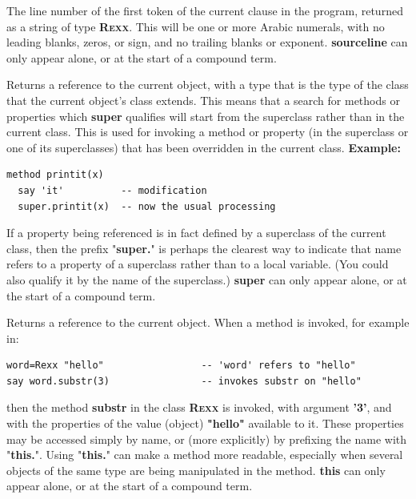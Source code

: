 \begin{description}
The line number of the first token of the current clause in the
\nr{} program, returned as a string of type \textbf{R\textsc{exx}}.
This will be one or more Arabic numerals, with no leading blanks, zeros,
or sign, and no trailing blanks or exponent.
 \textbf{sourceline} can only appear alone, or at the start of a
compound term.
\item[super]\label{refswsuper}
 
Returns a reference to the current object, with a type that is the
type of the class that the current object's class extends.
This means that a search for methods or properties
which \textbf{super} qualifies will start from the superclass rather
than in the current class.
This is used for invoking a method or property (in the superclass or one
of its superclasses) that has been overridden in the current class.
 \textbf{Example:}
\begin{lstlisting}
method printit(x)
  say 'it'          -- modification
  super.printit(x)  -- now the usual processing
\end{lstlisting}
 
If a property being referenced is in fact defined by a superclass of
the current class, then the prefix "\textbf{super.}" is perhaps
the clearest way to indicate that name refers to a property of a
superclass rather than to a local variable.
(You could also qualify it by the name of the superclass.)
 \textbf{super} can only appear alone, or at the start of a
compound term.
\item[this]\label{refswthis}
 
Returns a reference to the current object.
When a method is invoked, for example in:
\begin{lstlisting}
word=Rexx "hello"                 -- 'word' refers to "hello"
say word.substr(3)                -- invokes substr on "hello"
\end{lstlisting}
then the method \textbf{substr} in the class \textbf{R\textsc{exx}} is
invoked, with argument \textbf{'3'}, and with the properties of the
value (object) \textbf{"hello"} available to it.
These properties may be accessed simply by name, or (more explicitly) by
prefixing the name with "\textbf{this.}".
Using "\textbf{this.}" can make a method more readable,
especially when several objects of the same type are being manipulated
in the method.
 \textbf{this} can only appear alone, or at the start of a
compound term.
\item[trace]\label{refswtrace}


\end{description}

